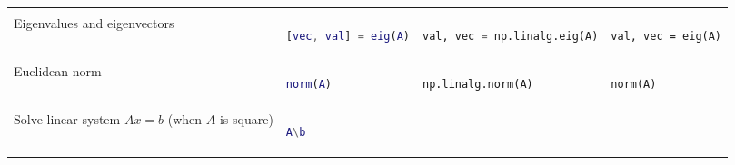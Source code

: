 \documentclass[10pt, landscape]{article}
\begin{document}
\begin{multicols}{2}
\begin{tabular}[]{@{}llll@{}}
\begin{minipage}[t]{0.20\columnwidth}
\end{minipage}\tabularnewline
\begin{minipage}[t]{0.23\columnwidth}\raggedright
Eigenvalues and eigenvectors
\end{minipage} & \begin{minipage}[t]{0.22\columnwidth}\raggedright
\begin{lstlisting}[language=Matlab]
[vec, val] = eig(A)
\end{lstlisting}

\end{minipage} & \begin{minipage}[t]{0.23\columnwidth}\raggedright
\begin{lstlisting}[language=Python]
val, vec = np.linalg.eig(A)
\end{lstlisting}

\end{minipage} & \begin{minipage}[t]{0.20\columnwidth}\raggedright
\begin{lstlisting}
val, vec = eig(A)
\end{lstlisting}

\end{minipage}\tabularnewline
\begin{minipage}[t]{0.23\columnwidth}\raggedright
Euclidean norm
\end{minipage} & \begin{minipage}[t]{0.22\columnwidth}\raggedright
\begin{lstlisting}[language=Matlab]
norm(A)
\end{lstlisting}

\end{minipage} & \begin{minipage}[t]{0.23\columnwidth}\raggedright
\begin{lstlisting}[language=Python]
np.linalg.norm(A)
\end{lstlisting}

\end{minipage} & \begin{minipage}[t]{0.20\columnwidth}\raggedright
\begin{lstlisting}
norm(A)
\end{lstlisting}

\end{minipage}\tabularnewline
\begin{minipage}[t]{0.23\columnwidth}\raggedright
Solve linear system \(Ax=b\) (when \(A\) is square)
\end{minipage} & \begin{minipage}[t]{0.22\columnwidth}\raggedright
\begin{lstlisting}[language=Matlab]
A\b
\end{lstlisting}


\end{minipage}
\end{tabular}
\end{multicols}
\end{document}
